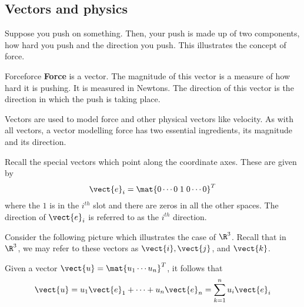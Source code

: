 \subsection{Vectors and physics}

Suppose you push
on something. Then, your push is made up of two components, how hard you push and the direction you push. This illustrates the concept of force.

\begin{definition}{Force}{force}
\textbf{Force} is a vector. The magnitude of this vector is a measure of how
hard it is pushing. It is measured in Newtons. The direction of this vector is the direction in which the push is taking place.
\end{definition}

Vectors are used to model force and other physical vectors like velocity.
 As with all vectors, a vector modelling force has two essential
ingredients, its magnitude and its direction.

Recall the special vectors which point along the coordinate axes.
These are given by 
\begin{equation*}
\vect{e}_{i} = \mat{0 \cdots 0 \; 1 \; 0 \cdots 0 }^T
\end{equation*}
where the $1$ is in the $i^{th}$ slot and there are zeros in all the other
spaces. The direction of $\vect{e}_{i}$ is referred to as the $i^{th}$ direction.

Consider the following picture which illustrates the case of $\R^{3}$. 
Recall that in $\R^3$, we may refer to these vectors as $\vect{i}, \vect{j}$, and $\vect{k}$. 

\begin{center}
\end{center}

Given a vector $\vect{u}=\mat{u_{1} \cdots u_{n}}^T $, it follows
that
\begin{equation*}
\vect{u}=u_{1}\vect{e}_{1}+\cdots +u_{n}\vect{e}_{n}=
\sum_{k=1}^{n}u_{i}\vect{e}_{i}
\end{equation*}


